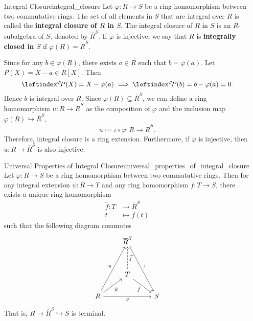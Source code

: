 \begin{definition}{Integral Closure}{integral_closure}
    Let $\varphi:R\to S$ be a ring homomorphism between two commutative rings. The set of all elements in $S$ that are integral over $R$ is called the \textbf{integral closure of $R$ in $S$}. The integral closure of $R$ in $S$ is an $R$-subalgebra of $S$, denoted by $\overline{R}^S$. If $\varphi$ is injective, we say that $R$ is \textbf{integrally closed in $S$} if $\varphi(R)=\overline{R}^S$.
\end{definition}
\begin{remark}
    Since for any $b\in \varphi(R)$, there exists $a\in R$ such that $b=\varphi(a)$. Let $P(X)=X-a\in R[X]$. Then 
    \[
        \leftindex^{\varphi}\!P(X)=X-\varphi(a)\implies \leftindex^{\varphi}\!P(b)=b-\varphi(a)=0.
    \]
    Hence $b$ is integral over $R$. Since $\varphi(R)\subseteq \overline{R}^S$, we can define a ring homomorphism $u:R\to \overline{R}^S$ as the composition of $\varphi$ and the inclusion map $\varphi(R)\hookrightarrow \overline{R}^S$.
    \[
    u:= \iota\circ \varphi:R\longrightarrow \overline{R}^S.
    \]
    Therefore, integral closure is a ring extension. Furthermore, if $\varphi$ is injective, then $u: R\to \overline{R}^S$ is also injective.
\end{remark}
\begin{proposition}{Universal Properties of Integral Closure}{universal_properties_of_integral_closure}
    Let $\varphi:R\to S$ be a ring homomorphism between two commutative rings. Then for any integral extension $\psi:R\to T$ and any ring homomorphism $f:T\to S$, there exists a unique ring homomorphism 
    \begin{align*}
        \widetilde{f}:T&\longrightarrow \overline{R}^S\\
        t&\longmapsto f(t)
    \end{align*}
    such that the following diagram commutes
    \[
        \begin{tikzcd}
                & \overline{R}^S \arrow[rdd, "\iota", hook]      &   \\[+1.5em]
                & T \arrow[rd, "f"'] \arrow[u, "\widetilde{f}"', dashed] &   \\
    R \arrow[rr, "\varphi"'] \arrow[ru, "\psi"'] \arrow[ruu, "u"] &                                                & S
    \end{tikzcd}
    \]
    That is, $R\to \overline{R}^S \hookrightarrow S$ is terminal.
\end{proposition}
